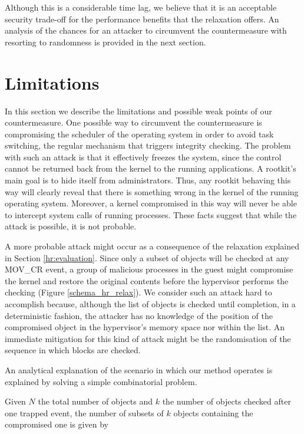 Although this is a considerable time lag, we believe that it is an acceptable security trade-off for the performance benefits that the relaxation offers. An analysis of the chances for an attacker to circumvent the countermeasure with resorting to randomness is provided in the next section. 

\section{Limitations}\label{hr:limitations}
In this section we describe the limitations and possible weak points of our countermeasure.
One possible way to circumvent the countermeasure is compromising the scheduler of the operating system in order to avoid task switching, the regular mechanism that triggers integrity checking. The problem with such an attack is that it effectively freezes the system, since the control cannot be returned back from the kernel to the running applications.
A rootkit's main goal is to hide itself from administrators. Thus, any rootkit behaving this way will clearly reveal that there is something wrong in the kernel of the running operating system. Moreover, a kernel compromised in this way will never be able to intercept system calls of running processes. These facts suggest that while the attack is possible, it is not probable.

A more probable attack might occur as a consequence of the relaxation explained in Section \ref{hr:evaluation}.
Since only a subset of objects will be checked at any MOV\_CR event, a group of malicious processes in the guest might compromise the kernel and restore the original contents before the hypervisor performs the checking (Figure \ref{schema_hr_relax}).
We consider such an attack hard to accomplish because, although the list of objects is checked until completion, in a deterministic fashion, the attacker has no knowledge of the position of the compromised object in the hypervisor's memory space nor within the list.
An immediate mitigation for this kind of attack might be the randomisation of the sequence in which blocks are checked.

An analytical explanation of the scenario in which our method operates is explained by solving a simple combinatorial problem.
  
Given $N$ the total number of objects and $k$ the number of objects checked after one trapped event,  the number of subsets of $k$ objects containing the compromised one is given by

